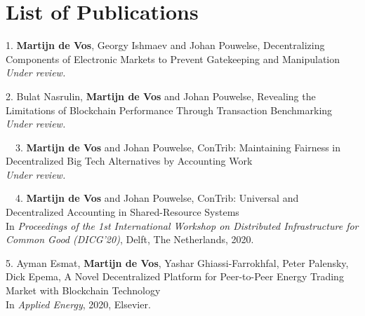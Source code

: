\chapter*{List of Publications}
\label{publications}

\begin{etaremune}{%
		
\item[1.] \textbf{Martijn de Vos}, Georgy Ishmaev and Johan Pouwelse, Decentralizing Components of Electronic Markets to Prevent Gatekeeping and Manipulation\\
\emph{Under review.}
		
\item[2.] Bulat Nasrulin, \textbf{Martijn de Vos} and Johan Pouwelse, Revealing the Limitations of Blockchain Performance Through Transaction Benchmarking\\
\emph{Under review.}


\item[\faFileTextO~~3.] \textbf{Martijn de Vos} and Johan Pouwelse, ConTrib: Maintaining Fairness in Decentralized Big Tech Alternatives by Accounting Work\\
\emph{Under review.}

\item[\faFileTextO~~4.] \textbf{Martijn de Vos} and Johan Pouwelse, ConTrib: Universal and Decentralized Accounting in Shared-Resource Systems\\
In \emph{Proceedings of the 1st International Workshop on Distributed Infrastructure for Common Good (DICG'20)}, Delft, The Netherlands, 2020.

\item[5.] Ayman Esmat, \textbf{Martijn de Vos}, Yashar Ghiassi-Farrokhfal, Peter Palensky, Dick Epema, A Novel Decentralized Platform for Peer-to-Peer Energy Trading Market with Blockchain Technology\\
In \emph{Applied Energy}, 2020, Elsevier.

}
\end{etaremune}
